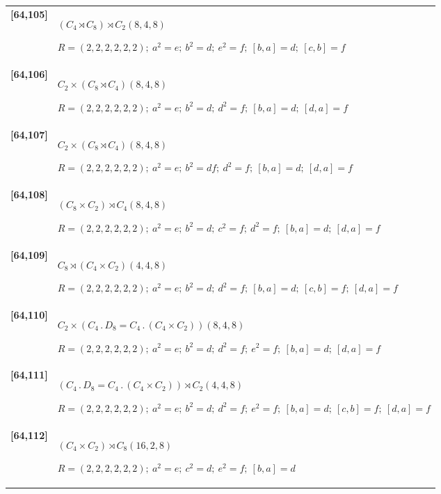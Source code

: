 \documentclass[UTF8,fontset=fandol,11pt,a4paper]{ctexart}
\begin{document}
\begin{longtable}{@{}p{17mm}>{\raggedright\arraybackslash}p{141mm}@{}}
\textbf{[64,105]} & $(C_{4}\rtimes C_{8})\rtimes C_{2}$\quad $(8,4,8)$\par\(R=(2,2,2,2,2,2);\allowbreak\ a^{2}=e;\allowbreak\ b^{2}=d;\allowbreak\ e^{2}=f;\allowbreak\ [b,a]=d;\allowbreak\ [c,b]=f\)\\[3pt]

\textbf{[64,106]} & $C_{2}\times (C_{8}\rtimes C_{4})$\quad $(8,4,8)$\par\(R=(2,2,2,2,2,2);\allowbreak\ a^{2}=e;\allowbreak\ b^{2}=d;\allowbreak\ d^{2}=f;\allowbreak\ [b,a]=d;\allowbreak\ [d,a]=f\)\\[3pt]

\textbf{[64,107]} & $C_{2}\times (C_{8}\rtimes C_{4})$\quad $(8,4,8)$\par\(R=(2,2,2,2,2,2);\allowbreak\ a^{2}=e;\allowbreak\ b^{2}=df;\allowbreak\ d^{2}=f;\allowbreak\ [b,a]=d;\allowbreak\ [d,a]=f\)\\[3pt]

\textbf{[64,108]} & $(C_{8}\times C_{2})\rtimes C_{4}$\quad $(8,4,8)$\par\(R=(2,2,2,2,2,2);\allowbreak\ a^{2}=e;\allowbreak\ b^{2}=d;\allowbreak\ c^{2}=f;\allowbreak\ d^{2}=f;\allowbreak\ [b,a]=d;\allowbreak\ [d,a]=f\)\\[3pt]

\textbf{[64,109]} & $C_{8}\rtimes (C_{4}\times C_{2})$\quad $(4,4,8)$\par\(R=(2,2,2,2,2,2);\allowbreak\ a^{2}=e;\allowbreak\ b^{2}=d;\allowbreak\ d^{2}=f;\allowbreak\ [b,a]=d;\allowbreak\ [c,b]=f;\allowbreak\ [d,a]=f\)\\[3pt]

\textbf{[64,110]} & $C_{2}\times (C_{4}\mathbin{.} D_{8} = C_{4}\mathbin{.} (C_{4}\times C_{2}))$\quad $(8,4,8)$\par\(R=(2,2,2,2,2,2);\allowbreak\ a^{2}=e;\allowbreak\ b^{2}=d;\allowbreak\ d^{2}=f;\allowbreak\ e^{2}=f;\allowbreak\ [b,a]=d;\allowbreak\ [d,a]=f\)\\[3pt]

\textbf{[64,111]} & $(C_{4}\mathbin{.} D_{8} = C_{4}\mathbin{.} (C_{4}\times C_{2}))\rtimes C_{2}$\quad $(4,4,8)$\par\(R=(2,2,2,2,2,2);\allowbreak\ a^{2}=e;\allowbreak\ b^{2}=d;\allowbreak\ d^{2}=f;\allowbreak\ e^{2}=f;\allowbreak\ [b,a]=d;\allowbreak\ [c,b]=f;\allowbreak\ [d,a]=f\)\\[3pt]

\textbf{[64,112]} & $(C_{4}\times C_{2})\rtimes C_{8}$\quad $(16,2,8)$\par\(R=(2,2,2,2,2,2);\allowbreak\ a^{2}=e;\allowbreak\ c^{2}=d;\allowbreak\ e^{2}=f;\allowbreak\ [b,a]=d\)\\[3pt]


\end{longtable}
\end{document}
